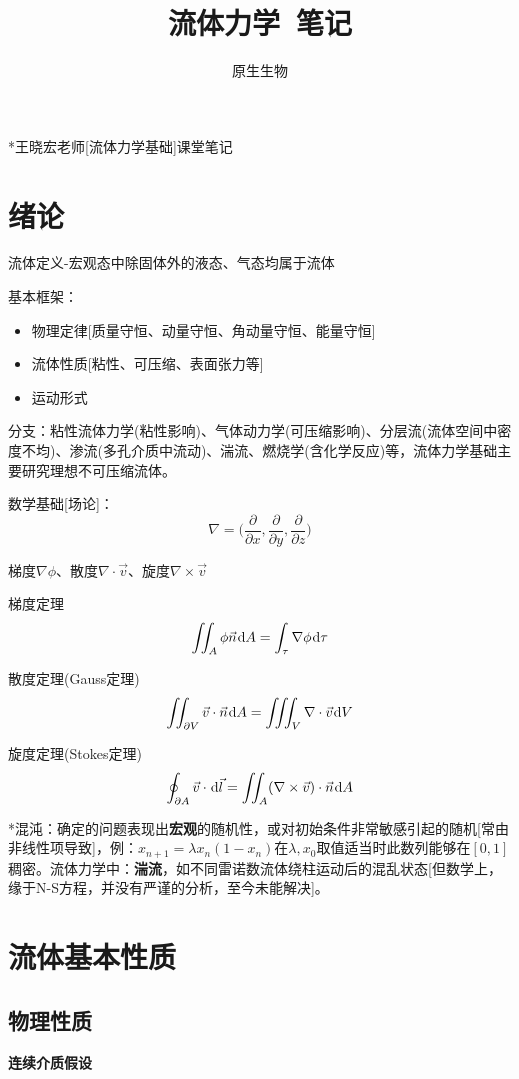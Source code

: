 \documentclass[a4paper,UTF8,fontset=windows]{ctexart}
\title{\textbf{流体力学\ 笔记}}
\author{原生生物}
\date{}
\newcommand*{\dr}{\hspace{0.07em}\mathrm{d}}
\begin{document}
\maketitle

*王晓宏老师[流体力学基础]课堂笔记

\tableofcontents

\newpage

\section{绪论}
流体定义-宏观态中除固体外的液态、气态均属于流体

基本框架：
\begin{itemize}
    \item 物理定律[质量守恒、动量守恒、角动量守恒、能量守恒]
    \item 流体性质[粘性、可压缩、表面张力等]
    \item 运动形式
\end{itemize}

分支：粘性流体力学(粘性影响)、气体动力学(可压缩影响)、分层流(流体空间中密度不均)、渗流(多孔介质中流动)、湍流、燃烧学(含化学反应)等，流体力学基础主要研究理想不可压缩流体。

数学基础[场论]：
$$\nabla=\big(\frac{\partial}{\partial x},\frac{\partial}{\partial y},\frac{\partial}{\partial z}\big)$$

梯度$\nabla\phi$、散度$\nabla\cdot\vec{v}$、旋度$\nabla\times\vec{v}$

梯度定理$$\iint_A\phi\vec{n}\dr A=\int_{\tau}\nabla\phi\dr\tau$$

散度定理(Gauss定理)$$\iint_{\partial V}\vec{v}\cdot\vec{n}\dr A=\iiint_V\nabla\cdot\vec{v}\dr V$$

旋度定理(Stokes定理)$$\oint_{\partial A}\vec{v}\cdot\dr\vec{l}=\iint_A(\nabla\times\vec{v})\cdot\vec{n}\dr A$$

*混沌：确定的问题表现出\textbf{宏观}的随机性，或对初始条件非常敏感引起的随机[常由非线性项导致]，例：$x_{n+1}=\lambda x_n(1-x_n)$在$\lambda,x_0$取值适当时此数列能够在$[0,1]$稠密。流体力学中：\textbf{湍流}，如不同雷诺数流体绕柱运动后的混乱状态[但数学上，缘于N-S方程，并没有严谨的分析，至今未能解决]。

\section{流体基本性质}
\subsection{物理性质}
\textbf{连续介质假设}
\end{document}
